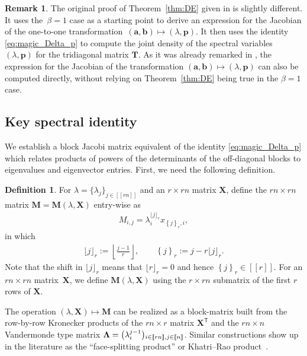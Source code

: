 \documentclass[pdftex]{sigma}
\numberwithin{equation}{section}
\theoremstyle{definition}
\newtheorem{Definition}[Theorem]{Definition}
\newtheorem{Remark}[Theorem]{Remark}
\newcommand{\lst}[1]{[\![#1 ]\!]}
\newcommand{\nint}[2]{\lfloor #1 \rfloor_{#2}}
\newcommand{\nfr}[2]{\left\{ #1 \right\}_{#2}}
\newcommand{\mbf}[1]{\mathbf{#1}}
\begin{document}
\begin{Remark}
The original proof of Theorem~\ref{thm:DE} given in \cite{DE} is slightly different. It uses the~${\beta=1}$ case as a starting point to derive an expression for the Jacobian of the one-to-one transformation~${(\mbf{a},\mbf{b}) \mapsto ({\lambda}, \mbf{p})}$. It then uses the identity \eqref{eq:magic_Delta_p} to
compute the joint density of the spectral variables $({\lambda}, \mbf{p})$ for the tridiagonal matrix $\mbf{T}$. As it was already remarked in \cite{DE}, the expression for the Jacobian of the transformation $(\mbf{a},\mbf{b}) \mapsto ({\lambda}, \mbf{p})$
can also be computed directly, without relying on Theorem~\ref{thm:DE} being true in the $\beta=1$ case.
\end{Remark}

\subsection{Key spectral identity}

We establish a block Jacobi matrix equivalent of the identity \eqref{eq:magic_Delta_p} which relates products of powers of the determinants of the off-diagonal blocks to eigenvalues and eigenvector entries. First, we need the following definition.

\begin{Definition}
For $\lambda = \{ \lambda_j\}_{j \in \lst{rn} }$ and an $r\times rn $ matrix $\mbf{X}$, define the $rn \times rn$ matrix $\mbf{M}=\mbf{M}({\lambda}, \mbf{X})$ entry-wise as
\begin{align}\label{eq:MagicM_ij}
 M_{i,j}=\lambda_i^{\nint{j}{r}} x_{ \nfr{j}{r},i},
\end{align}
in which
\begin{align*}
 \nint{j}{r}
 :=\left\lfloor \frac{j-1}{r} \right\rfloor, \qquad \nfr{j}{r}:=j-r \nint{j}{r}.
\end{align*}
Note that the shift in $ \nint{j}{r}$ means that $\lfloor r \rfloor_r = 0$ and hence
$\nfr{j}{r}\in \lst{r}$.
For an $rn \times rn$ matrix~$\mbf{X}$, we define $\mbf{M}({\lambda}, \mbf{X})$ using the $r \times rn$ submatrix of the first $r$ rows of $\mbf{X}$.
\end{Definition}

The operation $({\lambda}, \mbf{X})\mapsto \mbf{M}$ can be realized as
 a block-matrix built from the row-by-row Kronecker products of the $rn\times r$ matrix $\mbf{X}^{\mathsf T}$ and the
 $rn\times n$ Vandermonde type matrix $\mbf{\Lambda}=\smash{\bigl(\lambda_{i}^{j-1}\bigr){}_{i\in \lst{rn},j\in \lst{n}}}$. Similar constructions show up in the literature as the ``face-splitting product'' or Khatri--Rao product~\cite{KR_1968}.
\end{document}
